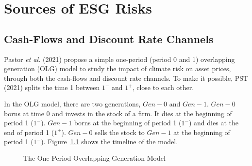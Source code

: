 \chapter{Sources of ESG Risks}


\section{Cash-Flows and Discount Rate Channels}

Pastor \textit{et al.} (2021)
propose a simple one-period (period 0 and 1) overlapping generation (OLG) model 
to study the impact of climate risk on asset prices,
through both the cash-flows and discount rate channels.
To make it possible, PST (2021) splits the time 1
between $1^{-}$ and $1^{+}$, close to each other.

In the OLG model, there are two generations, $Gen-0$ and $Gen-1$.
$Gen-0$ borns at time 0 and invests in the stock of a firm.
It dies at the beginning of period 1 ($1^{-}$).
$Gen-1$ borns at the beginning of period 1 ($1^{-}$) and dies at the end of period 1 ($1^{+}$).
$Gen-0$ sells the stock to $Gen-1$ at the beginning of period 1 ($1^{-}$).
Figure~\ref{fig:fig01} shows the timeline of the model.

\begin{figure}[htbp]
    \centering
    \caption{The One-Period Overlapping Generation Model}
    \label{fig:fig01}
\end{figure}

